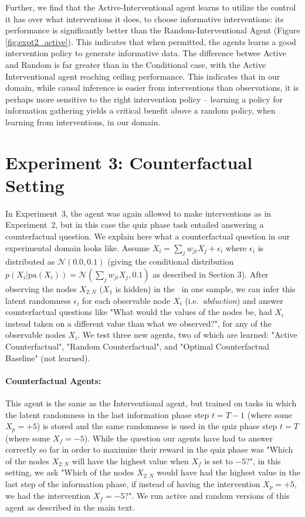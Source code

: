 Further, we find that the Active-Interventional agent learns to utilize the control it has over what interventions it does, to choose informative interventions: its performance is significantly better than the Random-Interventional Agent (Figure \ref{fig:expt2_active}). This indicates that when permitted, the agents learns a good intervention policy to generate informative data. The difference betwee Active and Random is far greater than in the Conditional case, with the Active Interventional agent reaching ceiling performance. This indicates that in our domain, while causal inference is easier from interventions than observations, it is perhaps more sensitive to the right intervention policy -- learning a policy for information gathering yields a critical benefit above a random policy, when learning from interventions, in our domain.



\section{Experiment 3: Counterfactual Setting}
\label{sec:expt3}

In Experiment~3, the agent was again allowed to make interventions as in Experiment~2, but in this case the quiz phase task entailed answering a counterfactual question. We explain here what a counterfactual question in our experimental domain looks like. Assume $X_i = \sum_{j} w_{ji}X_{j} + \epsilon_i$ where $\epsilon_i$ is distributed as $\mathcal{N}(0.0, 0.1)$ (giving the conditional distribution $p(X_i \vert \textrm{pa}(X_{i})) = \mathcal{N}(\sum_{j} w_{ji}X_{j},0.1)$ as described in Section 3). After observing the nodes $X_{2:N}$ ($X_{1}$ is hidden) in the \CBN~in one sample, we can infer this latent randomness $\epsilon_i$ for each observable node $X_i$ (i.e.~\textit{abduction}) and answer counterfactual questions like "What would the values of the nodes be, had $X_i$ instead taken on a different value than what we observed?", for any of the observable nodes $X_i$. We test three new agents, two of which are learned: "Active Counterfactual", "Random Counterfactual", and "Optimal Counterfactual Baseline" (not learned).


\paragraph{Counterfactual Agents:}
This agent is the same as the Interventional agent, but trained on tasks in which the latent randomness in the last information phase step $t = T-1$ (where some $X_p=+5$) is stored and the same randomness is used in the quiz phase step $t = T$ (where some $X_f=-5$). While the question our agents have had to answer correctly so far in order to maximize their reward in the quiz phase was "Which of the nodes $X_{2:N}$ will have the highest value when $X_f$ is set to $-5$?", in this setting, we ask "Which of the nodes $X_{2:N}$ would have had the highest value in the last step of the information phase, if instead of having the intervention $X_p=+5$,  we had the intervention $X_f = -5$?".
We run active and random versions of this agent as described in the main text.


